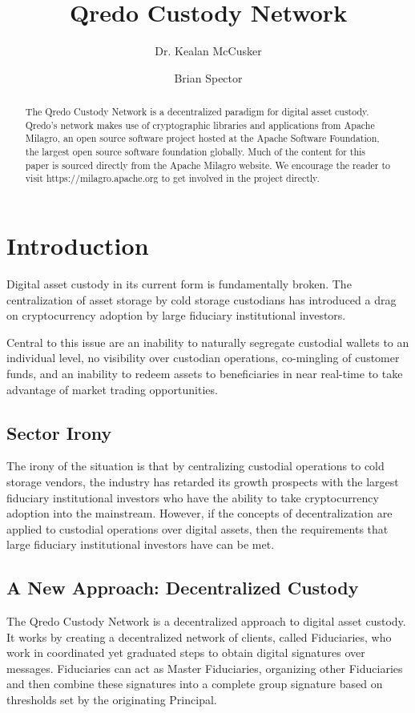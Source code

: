 \documentclass[num-refs]{wiley-networks}
\title{Qredo Custody Network}
\author[1\authfn{1}]{Dr. Kealan McCusker}
\author[2\authfn{1}]{Brian Spector}
\affil[1]{PPMC Member and Contributor to Apache Milagro, Chief Cryptographer at Qredo Ltd}
\affil[2]{PPMC Member and Contributor to Apache Milagro, Chief Product and Strategy Officer at Qredo Ltd}
\begin{document}
\maketitle

\begin{abstract}
The Qredo Custody Network is a decentralized paradigm for digital asset custody. Qredo's network makes use of cryptographic libraries and applications from Apache Milagro, an open source software project hosted at the Apache Software Foundation, the largest open source software foundation globally. Much of the content for this paper is sourced directly from the Apache Milagro website. We encourage the reader to visit https://milagro.apache.org to get involved in the project directly.
\end{abstract}

\section{Introduction}
Digital asset custody in its current form is fundamentally broken. The centralization of asset storage by cold storage custodians has introduced a drag on cryptocurrency adoption by large fiduciary institutional investors. 

Central to this issue are an inability to naturally segregate custodial wallets to an individual level, no visibility over custodian operations, co-mingling of customer funds, and an inability to redeem assets to beneficiaries in near real-time to take advantage of market trading opportunities.

\subsection{Sector Irony}
The irony of the situation is that by centralizing custodial operations to cold storage vendors, the industry has retarded its growth prospects with the largest fiduciary institutional investors who have the ability to take cryptocurrency adoption into the mainstream. However, if the concepts of decentralization are applied to custodial operations over digital assets, then the requirements that large fiduciary institutional investors have can be met.

\subsection{A New Approach: Decentralized Custody}
The Qredo Custody Network is a decentralized approach to digital asset custody. It works by creating a decentralized network of clients, called Fiduciaries, who work in coordinated yet graduated steps to obtain digital signatures over messages. Fiduciaries can act as Master Fiduciaries, organizing other Fiduciaries and then combine these signatures into a complete group signature based on thresholds set by the originating Principal. 
\end{document}
